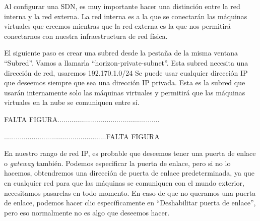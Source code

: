 Al configurar una SDN, es muy importante hacer una distinción entre la red interna y la red externa. La red interna es a la que se conectarán las máquinas virtuales  que creemos mientras que la red externa es la que nos permitirá conectarnos con nuestra infraestructura de red física.

El siguiente paso es crear una subred desde la pestaña de la misma ventana “Subred”. Vamos a llamarla “horizon-private-subnet”. Esta subred necesita una dirección de red, usaremos 192.170.1.0/24 %
Se puede usar cualquier dirección IP que deseemos siempre que sea una dirección IP privada. Esta es la subred que usarán internamente solo las máquinas virtuales y permitirá que las máquinas virtuales en la nube se comuniquen entre sí.

\begin{tcolorbox}[colback=green!5!white,colframe=green!75!black]
FALTA FIGURA....................................................

....................................................FALTA FIGURA
\end{tcolorbox}

En nuestro rango de red IP, es probable que deseemos tener una puerta de enlace o \textit{gateway} también. Podemos especificar la puerta de enlace, pero si no lo hacemos, obtendremos una dirección de puerta de enlace predeterminada, ya que en cualquier red para que las máquinas se comuniquen con el mundo exterior, necesitamos pasarelas en todo momento. En caso de que no queramos una puerta de enlace, podemos hacer clic específicamente en “Deshabilitar puerta de enlace”, pero eso normalmente no es algo que deseemos hacer.


